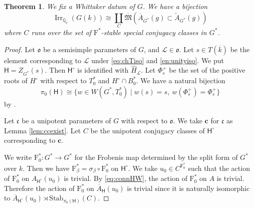 \documentclass[12pt,a4paper]{article}
\newtheorem{thm}{Theorem}[section]
\DeclareMathOperator{\Irr}{Irr}
\newcommand{\mb}{\mathbb}
\newcommand{\mc}{\mathcal}
\newcommand{\mr}{\mathrm}
\newcommand{\mf}{\mathfrak}
\newcommand{\mbf}{\mathbf}
\newcommand{\ms}{\mathsf}
\newcommand{\ol}{\overline}
\newcommand{\wh}{\widehat}
\begin{document}
\begin{thm}\label{thm:parposdual}
We fix a Whittaker datum of $G$. 
We have a bijection 
\begin{equation*}
	\Irr_{\ol{\mb{Q}}_{\ell}}(G(k)) \cong  \coprod_C  \ol{\mf{M}} \left( \ol{A}_{G^*}(g) \subset \widetilde{A}_{G^*}(g) \right)
\end{equation*}
where $C$ runs over the set of $\mr{F}^*$-stable special conjugacy classes in $G^*$.  
\end{thm}
\begin{proof}
Let $\mf{o}$ be a semisimple parameters of $G$, 
and $\mc{L} \in \mf{o}$. 
Let $s \in T(\ol{k})$ be the element corresponding to $\mc{L}$ under \eqref{eq:chTiso} and \eqref{en:unityiso}.  
We put $\ms{H}=Z_{G^*}(s)$. Then $\ms{H}^{\circ}$ is identified with $\wh{H}_{\mc{L}}$. 
Let $\Phi_s^+$ be the set of the positive roots of $H^{\circ}$ with respect to $T_0^*$ and $H^{\circ} \cap B_0^*$. 
We have a natural bijection 
\begin{equation}\label{eq:connHW}
 \pi_0 (\ms{H}) \cong \{ w \in W(G^*,T_0^*) \mid w(s)=s, \ w(\Phi_s^+)=\Phi_s^+ \} 
\end{equation} 
by \cite[1.1 Proposition]{DiMiLuspar}. 

Let $\mf{c}$ be a unipotent parameters of $G$ with respect to $\mf{o}$. We take $\mbf{c}$ for $\mf{c}$ as Lemma \ref{lem:ccexist}. 
Let $C$ be the unipotent conjugacy classes of $\ms{H}^{\circ}$ corresponding to $\mbf{c}$. 



We write $\mr{F}_{0}^* \colon G^* \to G^*$ for 
the Frobenis map determined by the split form of $G^*$ over $k$. 
Then we have $\mr{F}_{\beta}^*=\sigma_\beta \circ \mr{F}_{0}^*$ on $\ms{H}^{\circ}$. 
We take $u_0 \in C^{\mr{F}_{0}^*}$ such that the action of $\mr{F}_{0}^*$ on $A_{\ms{H}^{\circ}}(u_0)$ is trivial. 
By \eqref{eq:connHW}, 
the action of $\mr{F}_{0}^*$ on $A$ is trivial. 
Therefore the action of $\mr{F}_{0}^*$ on $\ol{A}_{\ms{H}}(u_0)$ is trivial since it is naturally isomorphic to $\ol{A}_{\ms{H}^{\circ}}(u_0) \rtimes \mathrm{Stab}_{\pi_0 (\ms{H})}(C)$. 



\end{proof}
\end{document}
